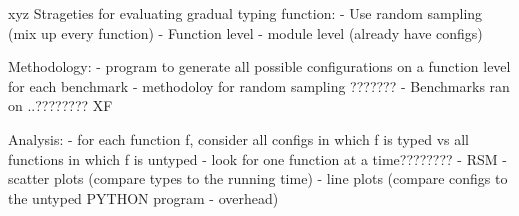 xyz
Strageties for evaluating gradual typing function:
- Use random sampling (mix up every function)
- Function level
- module level (already have configs)


Methodology:
- program to generate all possible configurations on a function level for each benchmark
- methodoloy for random sampling ???????
- Benchmarks ran on ..????????
XF

Analysis:
- for each function f, consider all configs in which f is typed vs all functions in which f is untyped
- look for one function at a time????????
- RSM 
- scatter plots (compare types to the running time)
- line plots (compare configs to the untyped PYTHON program - overhead)
